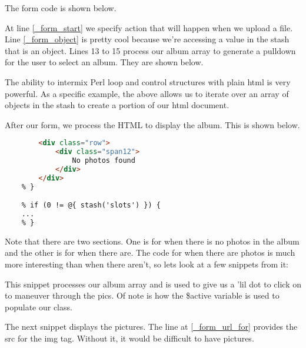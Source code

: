 \documentclass[14pt]{extreport}
\newcommand\Small{\fontsize{12}{13.0}\fontencoding{T1}\selectfont}
\newcommand*\LSTfont{\Small\ttfamily\SetTracking{encoding=*}{-60}\lsstyle}
\begin{document}
The form code is shown below.



At line \ref{_form_start} we specify action that will happen when we upload a
file.  Line \ref{_form_object} is pretty cool because we're accessing a value in
the stash that is an object.  Lines 13 to 15 process our album array to
generate a pulldown for the user to select an album.  They are shown below.



The ability to intermix Perl loop and control structures with plain html is
very powerful. As a specific example, the above allows us to iterate over an 
array of objects in the stash to create a portion of our html document.

After our form, we process the HTML to display the album.  This is shown below.

\begin{lstlisting}[language=Html, style=BlockStyle]
    % if (0 == @{ stash('slots') }) {
        <div class="row">
            <div class="span12">
                No photos found
            </div>
        </div>
    % }

    % if (0 != @{ stash('slots') }) {
    ...
    % }
\end{lstlisting}

Note that there are two sections.  One is for when there is no photos in the album
and the other is for when there are.  The code for when there are photos is much
more interesting than when there aren't, so lets look at a few snippets from it:



This snippet processes our album array and is used to give us a 'lil dot to click on
to maneuver through the pics.  Of note is how the \$active variable is used to populate
our class.



The next snippet displays the pictures. The line at \ref{_form_url_for} provides the 
src for the img tag. Without it, it would be difficult to have pictures.
\end{document}

